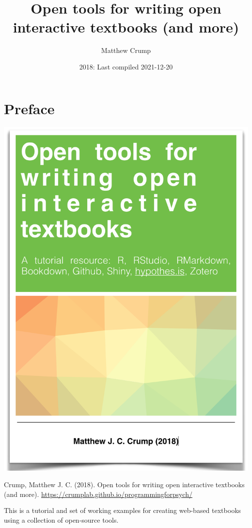 \documentclass[
]{book}
\title{Open tools for writing open interactive textbooks (and more)}
\author{Matthew Crump}
\date{2018: Last compiled 2021-12-20}
\begin{document}
\maketitle

{
\setcounter{tocdepth}{1}
\tableofcontents
}
\hypertarget{preface}{%
\chapter*{Preface}\label{preface}}

\begin{center}\includegraphics{OER} \end{center}

Crump, Matthew J. C. (2018). Open tools for writing open interactive textbooks (and more). \url{https://crumplab.github.io/programmingforpsych/}

This is a tutorial and set of working examples for creating web-based textbooks using a collection of open-source tools.
\end{document}
